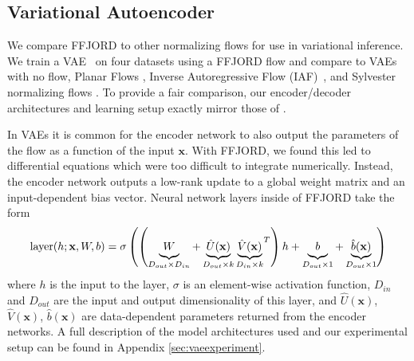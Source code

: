 \documentclass{article} %
\newcommand{\x}{\mathbf{x}}
\newcommand{\methodname}{FFJORD\xspace}
\newcommand\0{\kern-1.2pt\vec{\kern1.2pt 0}}
\begin{document}
\subsection{Variational Autoencoder}
We compare \methodname to other normalizing flows for use in variational inference.
We train a VAE~\citep{kingma2013auto} on four datasets using a \methodname flow and compare to VAEs with no flow, Planar Flows \citep{rezende2015variational}, Inverse Autoregressive Flow (IAF)~\citep{kingma2016improved}, and Sylvester normalizing flows \citep{berg2018sylvester}.
To provide a fair comparison, our encoder/decoder architectures and learning setup exactly mirror those of \citet{berg2018sylvester}.

In VAEs it is common for the encoder network to also output the parameters of the flow as a function of the input $\x$. With \methodname{}, we found this led to differential equations which were too difficult to integrate numerically.
Instead, the encoder network outputs a low-rank update to a global weight matrix and an input-dependent bias vector. 
Neural network layers inside of \methodname{} take the form%
\begin{equation}
    \text{layer}(h; \x, W, b) = \sigma \left(\left(\underbrace{W \vphantom{\hat{U}(\x)}}_{\footnotesize D_{out} \times D_{in}} + \underbrace{\hat{U}(\x)}_{\footnotesize D_{out} \times k}{\underbrace{\hat{V}(\x)}_{D_{in} \times k}}^T\right) h + \underbrace{b \vphantom{\hat{U}(\x)}}_{D_{out} \times 1} + \underbrace{\hat{b}(\x) \vphantom{\hat{U}(\x)}}_{D_{out} \times 1} \right)
\end{equation}
where $h$ is the input to the layer, $\sigma$ is an element-wise activation function, $D_{in}$ and $D_{out}$ are the input and output dimensionality of this layer, and $\hat{U}(\x)$, $\hat{V}(\x)$, $\hat{b}(\x)$ are data-dependent parameters returned from the encoder networks.
A full description of the model architectures used and our experimental setup can be found in Appendix \ref{sec:vaeexperiment}.
\end{document}
